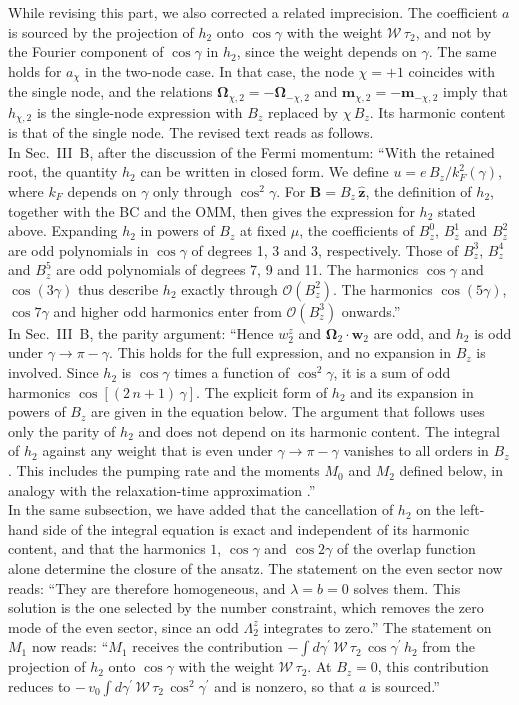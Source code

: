 \documentclass[aps,prb,onecolumn,nofootinbib,citeautoscript,10pt]{revtex4-2}
\DeclareRobustCommand{\bs}[1]{\bm{#1}}
\begin{document}
\begin{enumerate}
While revising this part, we also corrected a related imprecision. The coefficient $a$ is sourced by the projection of $h_2$ onto $\cos\gamma$ with the weight $\mathcal W\,\tau_2$, and not by the Fourier component of $\cos\gamma$ in $h_2$, since the weight depends on $\gamma$. The same holds for $a_\chi$ in the two-node case. In that case, the node $\chi=+1$ coincides with the single node, and the relations $\bs\Omega_{\chi,2}=-\bs\Omega_{-\chi,2}$ and $\bs m_{\chi,2}=-\bs m_{-\chi,2}$ imply that $h_{\chi,2}$ is the single-node expression with $B_z$ replaced by $\chi\,B_z$. Its harmonic content is that of the single node. The revised text reads as follows.
\\In Sec.~III~B, after the discussion of the Fermi momentum: ``With the retained root, the quantity $h_2$ can be written in closed form. We define $u=e\,B_z/k_F^2(\gamma)$, where $k_F$ depends on $\gamma$ only through $\cos^2\gamma$. For $\bs B=B_z\,\hat{\bs z}$, the definition of $h_2$, together with the BC and the OMM, then gives the expression for $h_2$ stated above. Expanding $h_2$ in powers of $B_z$ at fixed $\mu$, the coefficients of $B_z^0$, $B_z^1$ and $B_z^2$ are odd polynomials in $\cos\gamma$ of degrees 1, 3 and 3, respectively. Those of $B_z^3$, $B_z^4$ and $B_z^5$ are odd polynomials of degrees 7, 9 and 11. The harmonics $\cos\gamma$ and $\cos (3\gamma)$ thus describe $h_2$ exactly through $\mathcal O(B_z^2)$. The harmonics $\cos (5\gamma)$, $\cos7\gamma$ and higher odd harmonics enter from $\mathcal O(B_z^3)$ onwards.''
\\In Sec.~III~B, the parity argument: ``Hence $w^z_2$ and $\bs\Omega_2\cdot\bs w_2$ are odd, and $h_2$ is odd under $\gamma\to\pi-\gamma$. This holds for the full expression, and no expansion in $B_z$ is involved. Since $h_2$ is $\cos\gamma$ times a function of $\cos^2\gamma$, it is a sum of odd harmonics $\cos[(2\,n+1)\,\gamma]$. The explicit form of $h_2$ and its expansion in powers of $B_z$ are given in the equation below. The argument that follows uses only the parity of $h_2$ and does not depend on its harmonic content. The integral of $h_2$ against any weight that is even under $\gamma\to\pi-\gamma$ vanishes to all orders in $B_z$. This includes the pumping rate and the moments $M_0$ and $M_2$ defined below, in analogy with the relaxation-time approximation \cite{ips-firdous-vnr}.''
\\In the same subsection, we have added that the cancellation of $h_2$ on the left-hand side of the integral equation is exact and independent of its harmonic content, and that the harmonics $1$, $\cos\gamma$ and $\cos2\gamma$ of the overlap function alone determine the closure of the ansatz. The statement on the even sector now reads: ``They are therefore homogeneous, and $\lambda=b=0$ solves them. This solution is the one selected by the number constraint, which removes the zero mode of the even sector, since an odd $\Lambda^z_2$ integrates to zero.'' The statement on $M_1$ now reads: ``$M_1$ receives the contribution $-\int d\gamma^\prime\,\mathcal W\,\tau_2\,\cos\gamma^\prime\,h_2$ from the projection of $h_2$ onto $\cos\gamma$ with the weight $\mathcal W\,\tau_2$. At $B_z=0$, this contribution reduces to $-\,v_0\int d\gamma^\prime\,\mathcal W\,\tau_2\,\cos^2\gamma^\prime$ and is nonzero, so that $a$ is sourced.''

\end{enumerate}
\end{document}

